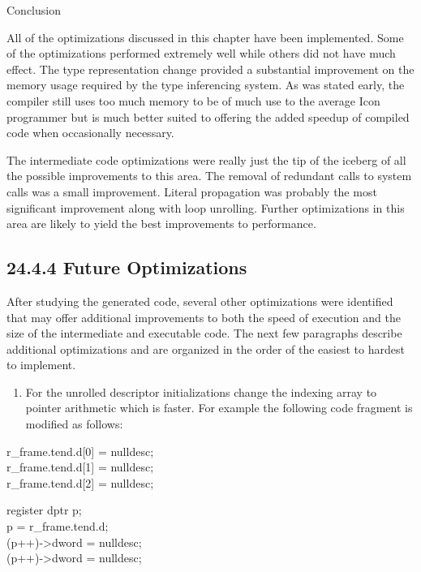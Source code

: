 {\sffamily
Conclusion}

All of the optimizations discussed in this chapter have been
implemented. Some of the optimizations performed extremely well while
others did not have much effect. The type representation change
provided a substantial improvement on the memory usage required by the
type inferencing system. As was stated early, the compiler still uses
too much memory to be of much use to the average Icon programmer but
is much better suited to offering the added speedup of compiled code
when occasionally necessary.

The intermediate code optimizations were really just the tip of the
iceberg of all the possible improvements to this area. The removal of
redundant calls to system calls was a small improvement. Literal
propagation was probably the most significant improvement along with
loop unrolling. Further optimizations in this area are likely to yield
the best improvements to performance.

\subsection[24.4.4 Future Optimizations]{24.4.4 Future Optimizations}

After studying the generated code, several other optimizations were
identified that may offer additional improvements to both the speed of
execution and the size of the intermediate and executable code. The
next few paragraphs describe additional optimizations and are
organized in the order of the easiest to hardest to implement.

\liststyleLxxxvi
\begin{enumerate}
\item 
For the unrolled descriptor initializations change the indexing array to pointer arithmetic which is faster. For example
the following code fragment is modified as follows: 
\end{enumerate}
\goodbreak
\begin{iconcode}
r\_frame.tend.d[0] = nulldesc;\\
r\_frame.tend.d[1] = nulldesc;\\
r\_frame.tend.d[2] = nulldesc;\\
\end{iconcode}
\goodbreak
\makebox[0.5\textwidth]{\hrulefill}
\begin{iconcode}
register dptr p;\\
p = r\_frame.tend.d;\\
(p++)->dword = nulldesc;\\
(p++)->dword = nulldesc;\\
\end{iconcode}

